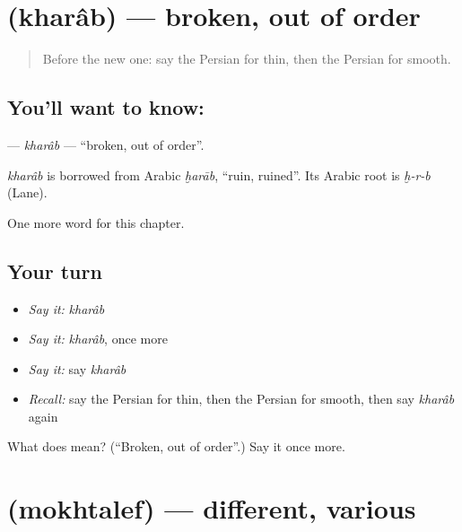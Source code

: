 \section[\texorpdfstring{\fa{خراب} (kharâb)}{خراب (kharâb)}]{ (kharâb) — broken, out of order}

\label{lesson:FA-C163-kharab}



\begin{quote}
Before the new one: say the Persian for thin, then the Persian for smooth.
\end{quote}

\subsection*{You'll want to know: }
\textbf{} — \emph{kharâb} — \textquotedblleft{}broken, out of order\textquotedblright{}.

\begin{cousinweb}
\emph{kharâb} is borrowed from Arabic \emph{ḫarāb}, \textquotedblleft{}ruin, ruined\textquotedblright{}. Its Arabic root is \emph{ḫ-r-b} (Lane).
\end{cousinweb}

\begin{grammarlens}[title={What you've built}]
One more word for this chapter.
\end{grammarlens}

\subsection*{Your turn}
\begin{itemize}
\raggedright
  \item \emph{Say it:} \emph{kharâb}
  \item \emph{Say it:} \emph{kharâb}, once more
  \item \emph{Say it:} say \emph{kharâb}
  \item \emph{Recall:} say the Persian for thin, then the Persian for smooth, then say \emph{kharâb} again
\end{itemize}

\begin{tcolorbox}[breakable,colback=teal!4,colframe=teal!35!black,title={Before you move on}]
What does  mean? (\textquotedblleft{}Broken, out of order\textquotedblright{}.) Say it once more.
\end{tcolorbox}
\section[\texorpdfstring{\fa{مختلف} (mokhtalef)}{مختلف (mokhtalef)}]{ (mokhtalef) — different, various}

